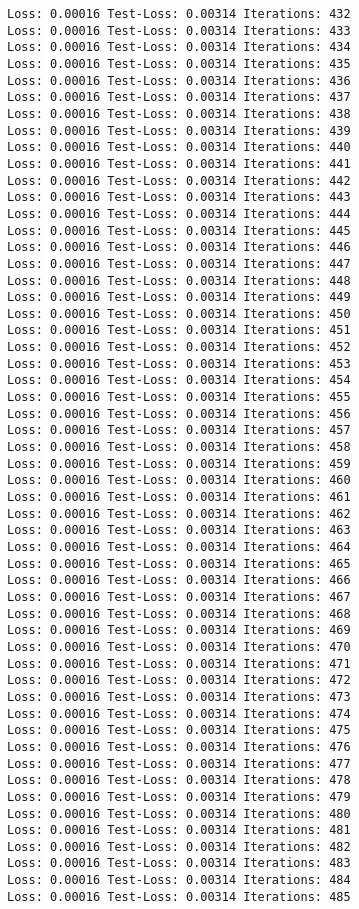 \documentclass[11pt]{article}
\begin{document}
\begin{Verbatim}[commandchars=\\\{\}]
Loss: 0.00016 Test-Loss: 0.00314 Iterations: 432
Loss: 0.00016 Test-Loss: 0.00314 Iterations: 433
Loss: 0.00016 Test-Loss: 0.00314 Iterations: 434
Loss: 0.00016 Test-Loss: 0.00314 Iterations: 435
Loss: 0.00016 Test-Loss: 0.00314 Iterations: 436
Loss: 0.00016 Test-Loss: 0.00314 Iterations: 437
Loss: 0.00016 Test-Loss: 0.00314 Iterations: 438
Loss: 0.00016 Test-Loss: 0.00314 Iterations: 439
Loss: 0.00016 Test-Loss: 0.00314 Iterations: 440
Loss: 0.00016 Test-Loss: 0.00314 Iterations: 441
Loss: 0.00016 Test-Loss: 0.00314 Iterations: 442
Loss: 0.00016 Test-Loss: 0.00314 Iterations: 443
Loss: 0.00016 Test-Loss: 0.00314 Iterations: 444
Loss: 0.00016 Test-Loss: 0.00314 Iterations: 445
Loss: 0.00016 Test-Loss: 0.00314 Iterations: 446
Loss: 0.00016 Test-Loss: 0.00314 Iterations: 447
Loss: 0.00016 Test-Loss: 0.00314 Iterations: 448
Loss: 0.00016 Test-Loss: 0.00314 Iterations: 449
Loss: 0.00016 Test-Loss: 0.00314 Iterations: 450
Loss: 0.00016 Test-Loss: 0.00314 Iterations: 451
Loss: 0.00016 Test-Loss: 0.00314 Iterations: 452
Loss: 0.00016 Test-Loss: 0.00314 Iterations: 453
Loss: 0.00016 Test-Loss: 0.00314 Iterations: 454
Loss: 0.00016 Test-Loss: 0.00314 Iterations: 455
Loss: 0.00016 Test-Loss: 0.00314 Iterations: 456
Loss: 0.00016 Test-Loss: 0.00314 Iterations: 457
Loss: 0.00016 Test-Loss: 0.00314 Iterations: 458
Loss: 0.00016 Test-Loss: 0.00314 Iterations: 459
Loss: 0.00016 Test-Loss: 0.00314 Iterations: 460
Loss: 0.00016 Test-Loss: 0.00314 Iterations: 461
Loss: 0.00016 Test-Loss: 0.00314 Iterations: 462
Loss: 0.00016 Test-Loss: 0.00314 Iterations: 463
Loss: 0.00016 Test-Loss: 0.00314 Iterations: 464
Loss: 0.00016 Test-Loss: 0.00314 Iterations: 465
Loss: 0.00016 Test-Loss: 0.00314 Iterations: 466
Loss: 0.00016 Test-Loss: 0.00314 Iterations: 467
Loss: 0.00016 Test-Loss: 0.00314 Iterations: 468
Loss: 0.00016 Test-Loss: 0.00314 Iterations: 469
Loss: 0.00016 Test-Loss: 0.00314 Iterations: 470
Loss: 0.00016 Test-Loss: 0.00314 Iterations: 471
Loss: 0.00016 Test-Loss: 0.00314 Iterations: 472
Loss: 0.00016 Test-Loss: 0.00314 Iterations: 473
Loss: 0.00016 Test-Loss: 0.00314 Iterations: 474
Loss: 0.00016 Test-Loss: 0.00314 Iterations: 475
Loss: 0.00016 Test-Loss: 0.00314 Iterations: 476
Loss: 0.00016 Test-Loss: 0.00314 Iterations: 477
Loss: 0.00016 Test-Loss: 0.00314 Iterations: 478
Loss: 0.00016 Test-Loss: 0.00314 Iterations: 479
Loss: 0.00016 Test-Loss: 0.00314 Iterations: 480
Loss: 0.00016 Test-Loss: 0.00314 Iterations: 481
Loss: 0.00016 Test-Loss: 0.00314 Iterations: 482
Loss: 0.00016 Test-Loss: 0.00314 Iterations: 483
Loss: 0.00016 Test-Loss: 0.00314 Iterations: 484
Loss: 0.00016 Test-Loss: 0.00314 Iterations: 485

\end{Verbatim}
\end{document}

